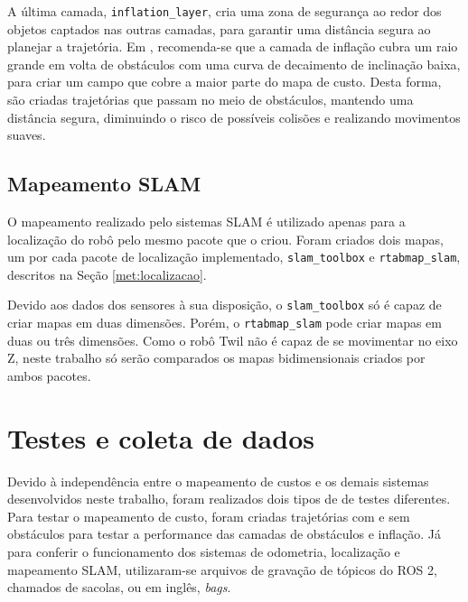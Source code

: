 \documentclass[repeatfields,xlists,xpacks,oneside,yearsonly]{ufrgscca}
\begin{document}
A última camada, \texttt{inflation\_layer}, cria uma zona de
segurança ao redor dos objetos captados nas outras camadas, para
garantir uma distância segura ao planejar a trajetória. Em
\textcite{ros_tuning_guide}, recomenda-se que a camada de inflação
cubra um raio grande em volta de obstáculos com uma curva de
decaimento de inclinação baixa, para criar um campo que cobre a maior
parte do mapa de custo. Desta forma, são criadas trajetórias que
passam no meio de obstáculos, mantendo uma distância segura,
diminuindo o risco de possíveis colisões e realizando movimentos
suaves.


\subsection{Mapeamento SLAM}

O mapeamento realizado pelo sistemas SLAM é utilizado apenas para a
localização do robô pelo mesmo pacote que o criou. Foram criados dois
mapas, um por cada pacote de localização implementado,
\texttt{slam\_toolbox} e \texttt{rtabmap\_slam}, descritos na Seção
\ref{met:localizacao}.

Devido aos dados dos sensores à sua disposição, o
\texttt{slam\_toolbox} só é capaz de criar mapas em duas dimensões.
Porém, o \texttt{rtabmap\_slam} pode criar mapas em duas ou três
dimensões. Como o robô Twil não é capaz de se movimentar no eixo Z,
neste trabalho só serão comparados os mapas bidimensionais criados
por ambos pacotes.


\section{Testes e coleta de dados}
\label{met:testes}

Devido à independência entre o mapeamento de custos e os demais
sistemas desenvolvidos neste trabalho, foram realizados dois tipos de
de testes diferentes. Para testar o mapeamento de custo, foram
criadas trajetórias com e sem obstáculos para testar a performance
das camadas de obstáculos e inflação. Já para conferir o
funcionamento dos sistemas de odometria, localização e mapeamento
SLAM, utilizaram-se arquivos de gravação de tópicos do ROS 2,
chamados de sacolas, ou em inglês, \textit{bags}.
\end{document}
